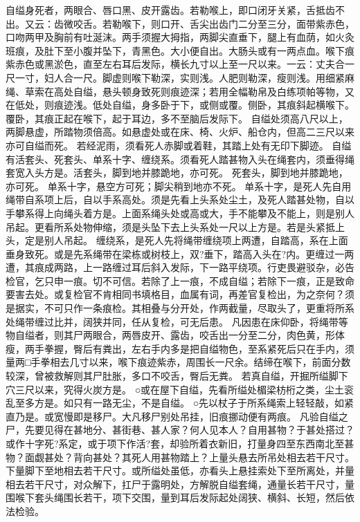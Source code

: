 \documentclass[12pt,UTF8]{ctexbook}
\begin{document}
自缢身死者，两眼合、唇口黑、皮开露齿。若勒喉上，即口闭牙关紧，舌抵齿不出。又云：齿微咬舌。若勒喉下，则口开、舌尖出齿门二分至三分，面带紫赤色，口吻两甲及胸前有吐涎沫。两手须握大拇指，两脚尖直垂下，腿上有血荫，如火灸班痕，及肚下至小腹并坠下，青黑色。大小便自出。大肠头或有一两点血。喉下痕紫赤色或黑淤色，直至左右耳后发际，横长九寸以上至一尺以来。一云：丈夫合一尺一寸，妇人合一尺。脚虚则喉下勒深，实则浅。人肥则勒深，瘦则浅。用细紧麻绳、草索在高处自缢，悬头顿身致死则痕迹深；若用全幅勒帛及白练项帕等物，又在低处，则痕迹浅。低处自缢，身多卧于下，或侧或覆。侧卧，其痕斜起横喉下。覆卧，其痕正起在喉下，起于耳边，多不至脑后发际下。
自缢处须高八尺以上，两脚悬虚，所踏物须倍高。如悬虚处或在床、椅、火炉、船仓内，但高二三尺以来亦可自缢而死。
若经泥雨，须看死人赤脚或着鞋，其踏上处有无印下脚迹。
自缢有活套头、死套头、单系十字、缠绕系。须看死人踏甚物入头在绳套内，须垂得绳套宽入头方是。活套头，脚到地并膝跪地，亦可死。
死套头，脚到地并膝跪地，亦可死。
单系十字，悬空方可死；脚尖稍到地亦不死。
单系十字，是死人先自用绳带自系项上后，自以手系高处。须是先看上头系处尘土，及死人踏甚处物，自以手攀系得上向绳头着方是。上面系绳头处或高或大，手不能攀及不能上，则是别人吊起。更看所系处物伸缩，须是头坠下去上头系处一尺以上方是。若是头紧抵上头，定是别人吊起。
缠绕系，是死人先将绳带缠绕项上两遭，自踏高，系在上面垂身致死。或是先系绳带在梁栋或树枝上，双?垂下，踏高入头在?内。更缠过一两遭，其痕成两路，上一路缠过耳后斜入发际，下一路平绕项。行吏畏避驳杂，必告检官，乞只申一痕。切不可信。若除了上一痕，不成自缢；若除下一痕，正是致命要害去处。或复检官不肯相同书填格目，血属有词，再差官复检出，为之奈何？须是据实，不可只作一条痕检。其相叠与分开处，作两截量，尽取头了，更重将所系处绳带缠过比并，阔狭并同，任从复检，可无后患。
凡因患在床仰卧，将绳带等物自缢者，则其尸两眼合，两唇皮开、露齿，咬舌出一分至二分，肉色黄，形体瘦，两手拳握，臀后有粪出，左右手内多是把自缢物色，至系紧死后只在手内，须量两□手拳相去几寸以来，喉下痕迹紫赤，周围长一尺余。结缔在喉下，前面分数较深，曾被救解则其尸肚胀，多口不咬舌，臀后无粪。
若真自缢，开掘所缢脚下穴三尺以来，究得火炭方是。
○或在屋下自缢，先看所缢处楣梁枋桁之类，尘土衮乱至多方是。如只有一路无尘，不是自缢。
○先以杖子于所系绳索上轻轻敲，如紧直乃是。或宽慢即是移尸。大凡移尸别处吊挂，旧痕挪动便有两痕。
凡验自缢之尸，先要见得在甚地分、甚街巷、甚人家？何人见本人？自用甚物？于甚处搭过？或作十字死?系定，或于项下作活?套，却验所着衣新旧，打量身四至东西南北至甚物？面觑甚处？背向甚处？其死人用甚物踏上？上量头悬去所吊处相去若干尺寸。下量脚下至地相去若干尺寸。或所缢处虽低，亦看头上悬挂索处下至所离处，并量相去若干尺寸，对众解下，扛尸于露明处，方解脱自缢套绳，通量长若干尺寸，量围喉下套头绳围长若干，项下交围，量到耳后发际起处阔狭、横斜、长短，然后依法检验。
\end{document}
